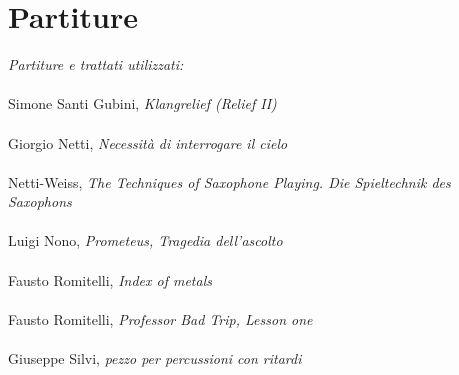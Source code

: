 
\chapter*{Partiture}
\label{chp:Partiture}
\textit{Partiture e trattati utilizzati:} \\
\\
Simone Santi Gubini, \textit{Klangrelief (Relief II)} \\
\\
Giorgio Netti, \textit{Necessità di interrogare il cielo} \\
\\
Netti-Weiss, \textit{The Techniques of Saxophone Playing. Die Spieltechnik des Saxophons} \\
\\
Luigi Nono, \textit{Prometeus, Tragedia dell'ascolto}\\
\\
Fausto Romitelli, \textit{Index of metals}\\
\\
Fausto Romitelli, \textit{Professor Bad Trip, Lesson one}\\
\\
Giuseppe Silvi, \textit{pezzo per percussioni con ritardi} \\
\\